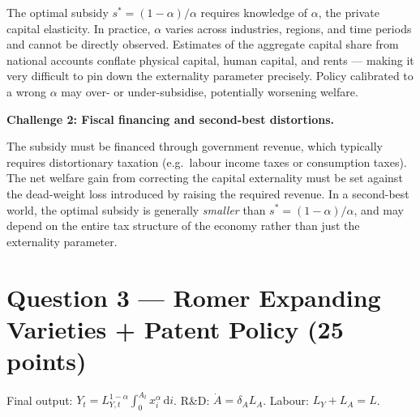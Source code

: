 \documentclass[a4paper,11pt]{article}
\newcommand{\dd}{\mathrm{d}}
\begin{document}
\begin{enumerate}[label=\textbf{(\arabic*)},leftmargin=*]
\begin{answerbox}
The optimal subsidy $s^* = (1-\alpha)/\alpha$ requires knowledge of $\alpha$, the private capital elasticity. In practice, $\alpha$ varies across industries, regions, and time periods and cannot be directly observed. Estimates of the aggregate capital share from national accounts conflate physical capital, human capital, and rents --- making it very difficult to pin down the externality parameter precisely. Policy calibrated to a wrong $\alpha$ may over- or under-subsidise, potentially worsening welfare.

\textbf{Challenge 2: Fiscal financing and second-best distortions.}

The subsidy must be financed through government revenue, which typically requires distortionary taxation (e.g.\ labour income taxes or consumption taxes). The net welfare gain from correcting the capital externality must be set against the dead-weight loss introduced by raising the required revenue. In a second-best world, the optimal subsidy is generally \emph{smaller} than $s^* = (1-\alpha)/\alpha$, and may depend on the entire tax structure of the economy rather than just the externality parameter.
\end{answerbox}

\end{enumerate}

\clearpage

\section*{Question 3 --- Romer Expanding Varieties + Patent Policy \hfill (25 points)}

Final output: $Y_t = L_{Y,t}^{1-\alpha}\int_0^{A_t} x_i^{\alpha}\,\dd i$. R\&D: $\dot{A} = \delta_A L_A$. Labour: $L_Y + L_A = L$.
\end{document}
